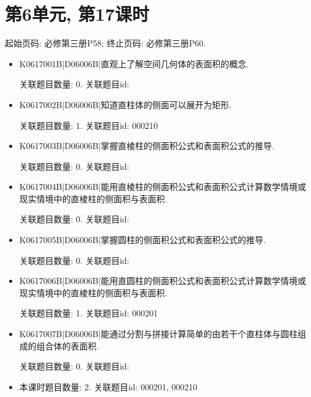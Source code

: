 \section*{第6单元, 第17课时}
起始页码: 必修第三册P58; 终止页码: 必修第三册P60.
\begin{itemize}
\item K0617001B|D06006B|直观上了解空间几何体的表面积的概念.

关联题目数量: 0. 关联题目id: 

\item K0617002B|D06006B|知道直柱体的侧面可以展开为矩形.

关联题目数量: 1. 关联题目id: 000210

\item K0617003B|D06006B|掌握直棱柱的侧面积公式和表面积公式的推导.

关联题目数量: 0. 关联题目id: 

\item K0617004B|D06006B|能用直棱柱的侧面积公式和表面积公式计算数学情境或现实情境中的直棱柱的侧面积与表面积.

关联题目数量: 0. 关联题目id: 

\item K0617005B|D06006B|掌握圆柱的侧面积公式和表面积公式的推导.

关联题目数量: 0. 关联题目id: 

\item K0617006B|D06006B|能用直圆柱的侧面积公式和表面积公式计算数学情境或现实情境中的直棱柱的侧面积与表面积.

关联题目数量: 1. 关联题目id: 000201

\item K0617007B|D06006B|能通过分割与拼接计算简单的由若干个直柱体与圆柱组成的组合体的表面积.

关联题目数量: 0. 关联题目id: 

\item 本课时题目数量: 2. 关联题目id: 000201, 000210

\end{itemize}

